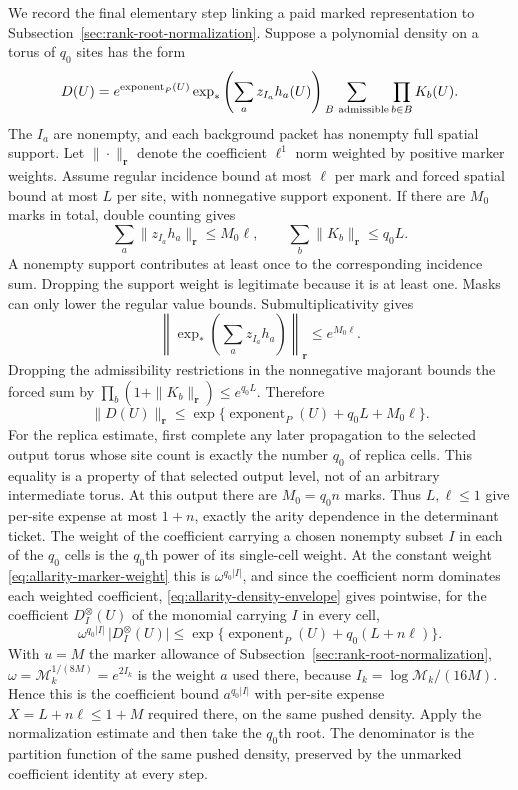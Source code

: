 We record the final elementary step linking a paid marked representation
to Subsection~\ref{sec:rank-root-normalization}. Suppose a polynomial
density on a torus of $q_0$ sites has the form
\[
 D(U)=e^{\operatorname{exponent}_P(U)}
       \exp_*\left(\sum_a z_{I_a}h_a(U)\right)
       \sum_{B\ {\rm admissible}}\prod_{b\in B}K_b(U).
\]
The $I_a$ are nonempty, and each background packet has nonempty full
spatial support. Let $\|\cdot\|_{\boldsymbol r}$ denote the coefficient
$\ell^1$ norm weighted by positive marker weights. Assume regular
incidence bound at most $\ell$ per mark and forced spatial bound at
most $L$ per site, with nonnegative support exponent. If there are
$M_0$ marks in total, double counting gives
\[
 \sum_a\|z_{I_a}h_a\|_{\boldsymbol r}\le M_0\ell,
       \qquad\sum_b\|K_b\|_{\boldsymbol r}\le q_0 L.
\]
A nonempty support contributes at least once to the corresponding
incidence sum. Dropping the support weight is legitimate because it
is at least one. Masks can only lower the regular value bounds.
Submultiplicativity gives
\[
 \left\|\exp_*\left(\sum_a z_{I_a}h_a\right)\right\|_{\boldsymbol r}
       \le e^{M_0\ell}.
\]
Dropping the admissibility restrictions in the nonnegative majorant
bounds the forced sum by
$\prod_b(1+\|K_b\|_{\boldsymbol r})\le e^{q_0 L}$. Therefore
\begin{equation}\label{eq:allarity-density-envelope}
 \|D(U)\|_{\boldsymbol r}
      \le\exp\{\operatorname{exponent}_P(U)+q_0L+M_0\ell\}.
\end{equation}
For the replica estimate, first complete any later propagation to the
selected output torus whose site count is exactly the number $q_0$ of
replica cells. This equality is a property of that selected output
level, not of an arbitrary intermediate torus. At this output there
are $M_0=q_0 n$ marks. Thus $L,\ell\le1$
give per-site expense at most $1+n$, exactly the arity dependence
in the determinant ticket. The weight of the coefficient carrying
a chosen nonempty subset $I$ in each of the $q_0$ cells is the
$q_0$th power of its single-cell weight. At the constant weight
\eqref{eq:allarity-marker-weight} this is $\omega^{q_0|I|}$, and
since the coefficient norm dominates each weighted coefficient,
\eqref{eq:allarity-density-envelope} gives pointwise, for the
coefficient $D_{I}^{\otimes}(U)$ of the monomial carrying $I$ in every
cell,
\[
 \omega^{q_0|I|}\,\bigl|D_{I}^{\otimes}(U)\bigr|
   \le\exp\{\operatorname{exponent}_P(U)+q_0(L+n\ell)\}.
\]
With $u=M$ the marker allowance of
Subsection~\ref{sec:rank-root-normalization}, $\omega=\mathcal
M_k^{1/(8M)}=e^{2I_k}$ is the weight $a$ used there, because
$I_k=\log\mathcal M_k/(16M)$. Hence this is the coefficient bound
$a^{q_0|I|}$ with per-site expense $X=L+n\ell\le1+M$ required there,
on the same pushed density. Apply the normalization
estimate and then take the $q_0$th root. The denominator is the
partition function of the same pushed density, preserved by the
unmarked coefficient identity at every step.

